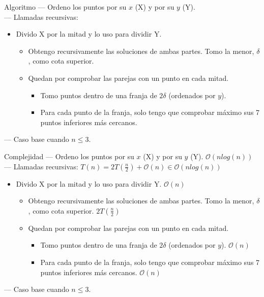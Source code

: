     
    \begin{frame}{Algoritmo}{}
    {\color{orange}---} Ordeno los puntos por su $x$ (X) y por su $y$ (Y).\\
    {\color{orange}---} Llamadas recursivas:
    \begin{itemize}
        \item Divido X por la mitad y lo uso para dividir Y.
        \begin{itemize}
        \item Obtengo recursivamente las soluciones de ambas partes. Tomo la menor, $\delta$, como cota superior.
        \item Quedan por comprobar las parejas con un punto en cada mitad.
            \begin{itemize}
            \item Tomo puntos dentro de una franja de $2\delta$ (ordenados por $y$).
            \item Para cada punto de la franja, solo tengo que comprobar máximo sus 7 puntos inferiores más cercanos.
            \end{itemize}
        \end{itemize}
    \end{itemize}
    {\color{orange}---} Caso base cuando $n\leq 3$.
    \end{frame}
    
    \begin{frame}{Complejidad}{}
    {\color{orange}---} Ordeno los puntos por su $x$ (X) y por su $y$ (Y). {\color{orange}$\mathcal{O}(nlog(n))$}\\
    {\color{orange}---} Llamadas recursivas: {\color{orange}$T(n)=2T(\frac{n}{2})+\mathcal{O}(n)\in\mathcal{O}(nlog(n))$}
    \begin{itemize}
        \item Divido X por la mitad y lo uso para dividir Y. {\color{orange}$\mathcal{O}(n)$}
        \begin{itemize}
        \item Obtengo recursivamente las soluciones de ambas partes. Tomo la menor, $\delta$, como cota superior. {\color{orange}$2T(\frac{n}{2})$}
        \item Quedan por comprobar las parejas con un punto en cada mitad.
            \begin{itemize}
            \item Tomo puntos dentro de una franja de $2\delta$ (ordenados por $y$). {\color{orange}$\mathcal{O}(n)$}
            \item Para cada punto de la franja, solo tengo que comprobar máximo sus 7 puntos inferiores más cercanos. {\color{orange}$\mathcal{O}(n)$}
            \end{itemize}
        \end{itemize}
    \end{itemize}
    {\color{orange}---} Caso base cuando $n\leq 3$.
    \end{frame}
    
